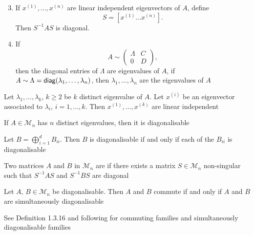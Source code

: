 \documentclass[aspectratio=169]{beamer}
\begin{document}
\begin{frame}
\addtocounter{theorem}{-1}
\begin{theorem}[continued]
\begin{enumerate}
\setcounter{enumi}{2}
\item If $x^{(1)},\ldots, x^{(n)}$ are linear independent eigenvectors of $A$, define 
\[S= [ x^{(1)} \ldots x^{(n)}].\]
Then $S^{-1} AS$ is diagonal.
\item If 
\[A\sim \begin{pmatrix}
\Lambda & C\\
0& D
\end{pmatrix},\]
then the diagonal entries of $\Lambda$ are eigenvalues of $A$, if $A\sim\Lambda = \mathsf{diag} (\lambda_1, \ldots, \lambda_n)$, then $\lambda_1, \ldots, \lambda_n$ are the eigenvalues of $A$
\end{enumerate}
\end{theorem}
\end{frame}


\begin{frame}
\begin{lemma}
Let $\lambda_1, \ldots, \lambda_k$, $k \geq 2$ be $k$ distinct eigenvalue of $A$. Let $x^{(i)}$ be an eigenvector associated to $\lambda_i$, $i= 1, \ldots, k$. Then $x^{(1)}, \ldots, x^{(k)}$ are linear independent
\end{lemma}
\vfill
\begin{theorem}
If $A\in \mathcal{M}_n$ has $n$ distinct eigenvalues, then it is diagonalisable
\end{theorem}
\vfill
\begin{lemma}
Let $B= \bigoplus\limits_{i=1}^d B_{ii}$. Then $B$ is diagonalisable if and only if each of the $B_{ii}$ is diagonalisable
\end{lemma}
\end{frame}


\begin{frame}
\begin{definition}
Two matrices $A$ and $B$ in $\mathcal{M}_n$ are  if there exists a matrix $S\in \mathcal{M}_n$ non-singular such that $S^{-1} AS$ and $S^{-1} BS$ are diagonal 
\end{definition}
\vfill
\begin{theorem}
Let $A,\, B\in \mathcal{M}_n$ be diagonalisable. Then $A$ and $B$ commute if and only if $A$ and $B$ are simultaneously diagonalisable
\end{theorem}
\vfill
\begin{remark}
See Definition 1.3.16 and following for commuting families and simultaneously diagonalisable families
\end{remark}
\end{frame}
\end{document}
